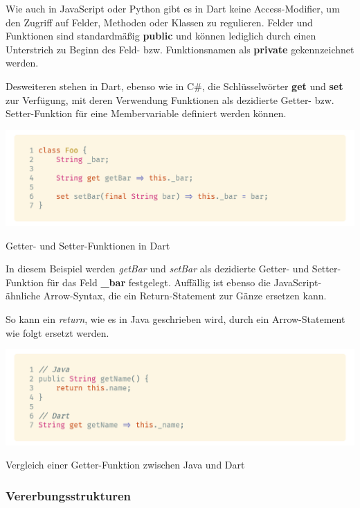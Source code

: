 Wie auch in JavaScript oder Python gibt es in Dart keine Access-Modifier, um den Zugriff auf Felder, Methoden oder Klassen zu regulieren. Felder und Funktionen sind standardmäßig \textbf{public} und können lediglich durch einen Unterstrich zu Beginn des Feld- bzw. Funktionsnamen als \textbf{private} gekennzeichnet werden.

Desweiteren stehen in Dart, ebenso wie in C\#, die Schlüsselwörter \textbf{get} und \textbf{set} zur Verfügung, mit deren Verwendung Funktionen als dezidierte Getter- bzw.
Setter-Funktion für eine Membervariable definiert werden können.

\begin{code}[h]
    \centering
    \includegraphics[width=1\textwidth]{images/Dart/theory/dartGetterSetter.png}
    \caption{Getter- und Setter-Funktionen in Dart}
\end{code}

In diesem Beispiel werden \textit{getBar} und \textit{setBar} als dezidierte Getter- und Setter-Funktion für das Feld \textbf{\_bar} festgelegt. Auffällig ist ebenso die JavaScript-ähnliche Arrow-Syntax, die ein Return-Statement zur Gänze ersetzen kann.

So kann ein \textit{return}, wie es in Java geschrieben wird, durch ein Arrow-Statement wie folgt
ersetzt werden.

\begin{code}[h]
    \centering
    \includegraphics[width=1\textwidth]{images/Dart/theory/dartVSJavaGetter.png}
    \caption{Vergleich einer Getter-Funktion zwischen Java und Dart}
\end{code}

\newpage

\subsubsection{Vererbungsstrukturen}

